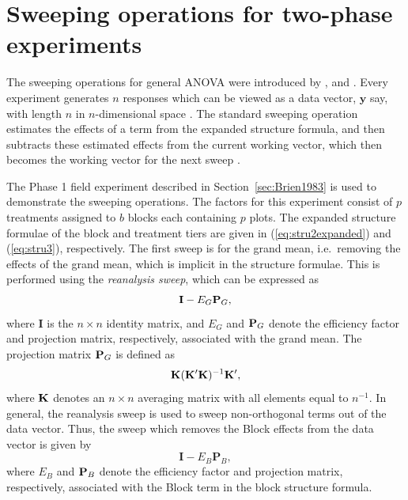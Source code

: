 \section{Sweeping operations for two-phase experiments}\label{sec:Brien1999}
The sweeping operations for general ANOVA were introduced by \cite{Wilkinson1970}, and \cite{Payne1977}. Every experiment generates $n$ responses which can be viewed as a data vector, $\bm{y}$ say, with length $n$ in $n$-dimensional space \citep{Payne1977}. The standard sweeping operation estimates the effects of a term from the expanded structure formula, and then subtracts these estimated effects from the current working vector, which  then becomes the working vector for the next sweep \citep{Brien1999}. 


The Phase 1 field experiment described in Section~\ref{sec:Brien1983} is used to demonstrate the sweeping operations. The factors for this experiment consist of $p$ treatments assigned to $b$ blocks each containing $p$ plots. The expanded structure formulae of the block and treatment tiers are given in (\ref{eq:stru2expanded}) and (\ref{eq:stru3}), respectively. The first sweep is for the grand mean, i.e.\ removing the effects of the grand mean, which is implicit in the structure formulae. This is performed using the \emph{reanalysis sweep}, which can be expressed as 
\begin{equation}\label{eq:sweepGM}
\mathbf{I} - E_{G} \mathbf{P}_{G},
\end{equation}
where $\mathbf{I}$ is the $n \times n$ identity matrix, and $E_{G}$ and $\mathbf{P}_{G}$ denote the efficiency factor and projection matrix, respectively, associated with the grand mean. The projection matrix $\mathbf{P}_{G}$ is defined as 
\[ {\mathbf{K}}({\mathbf{K}}'{\mathbf{K}})^{-1}{\mathbf{K}}',\]
where $\mathbf{K}$ denotes an $n \times n$ averaging matrix with all elements equal to ${n}^{-1}$. In general, the reanalysis sweep is used to sweep non-orthogonal terms out of the data vector. Thus, the sweep which removes the Block effects from the data vector is given by  
\[\mathbf{I} - E_B \mathbf{P}_B,\]
where $E_{B}$ and $\mathbf{P}_{B}$ denote the efficiency factor and projection matrix, respectively, associated with the Block term in the block structure formula. 

